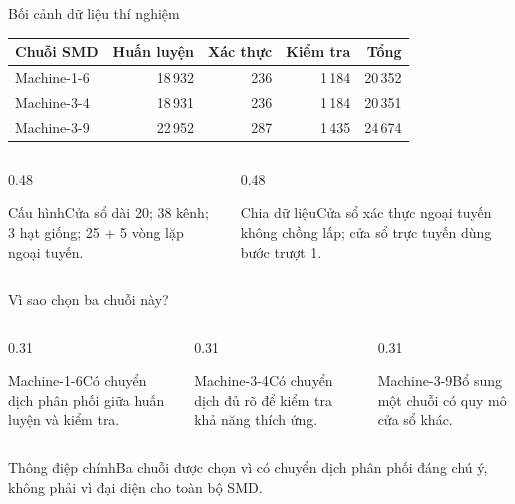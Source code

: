 \documentclass[aspectratio=169]{beamer}
\newcommand{\takeaway}[1]{\begin{alertblock}{Thông điệp chính}#1\end{alertblock}}
\begin{document}
\begin{frame}{Bối cảnh dữ liệu thí nghiệm}
  \scriptsize
  \begin{tabular}{lrrrr}
    \toprule
    Chuỗi SMD & Huấn luyện & Xác thực & Kiểm tra & Tổng \\
    \midrule
    Machine-1-6 & 18\,932 & 236 & 1\,184 & 20\,352 \\
    Machine-3-4 & 18\,931 & 236 & 1\,184 & 20\,351 \\
    Machine-3-9 & 22\,952 & 287 & 1\,435 & 24\,674 \\
    \bottomrule
  \end{tabular}
  \vspace{0.4em}
  \begin{columns}[T,onlytextwidth]
    \begin{column}{0.48\textwidth}\begin{block}{Cấu hình}\small Cửa sổ dài 20; 38 kênh; 3 hạt giống; 25 + 5 vòng lặp ngoại tuyến.\end{block}\end{column}
    \begin{column}{0.48\textwidth}\begin{block}{Chia dữ liệu}\small Cửa sổ xác thực ngoại tuyến không chồng lấp; cửa sổ trực tuyến dùng bước trượt 1.\end{block}\end{column}
  \end{columns}
\end{frame}

\begin{frame}{Vì sao chọn ba chuỗi này?}
  \begin{columns}[T,onlytextwidth]
    \begin{column}{0.31\textwidth}\begin{block}{Machine-1-6}\centering Có chuyển dịch phân phối giữa huấn luyện và kiểm tra.\end{block}\end{column}
    \begin{column}{0.31\textwidth}\begin{block}{Machine-3-4}\centering Có chuyển dịch đủ rõ để kiểm tra khả năng thích ứng.\end{block}\end{column}
    \begin{column}{0.31\textwidth}\begin{block}{Machine-3-9}\centering Bổ sung một chuỗi có quy mô cửa sổ khác.\end{block}\end{column}
  \end{columns}
  \takeaway{Ba chuỗi được chọn vì có chuyển dịch phân phối đáng chú ý, không phải vì đại diện cho toàn bộ SMD.}
\end{frame}
\end{document}
